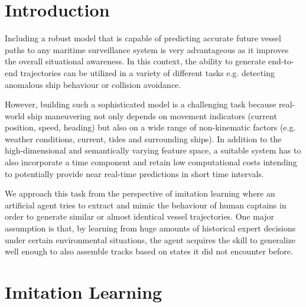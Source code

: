 \documentclass[conference]{IEEEtran}
\begin{document}
\section{Introduction}
Including a robust model that is capable of predicting accurate future vessel paths to any maritime surveillance system is very advantageous as it improves the overall situational awareness. In this context, the ability to generate end-to-end trajectories can be utilized in a variety of different tasks e.g. detecting anomalous ship behaviour or collision avoidance.
\par
However, building such a sophisticated model is a challenging task because real-world ship maneuvering not only depends on movement indicators (current position, speed, heading) but also on a wide range of non-kinematic factors (e.g. weather conditions, current, tides and surrounding ships). In addition to the high-dimensional and semantically varying feature space, a suitable system has to also incorporate a time component and retain low computational costs intending to potentially provide near real-time predictions in short time intervals.
\par
We approach this task from the perspective of imitation learning where an artificial agent tries to extract and mimic the behaviour of human captains in order to generate similar or almost identical vessel trajectories. One major assumption is that, by learning from huge amounts of historical expert decisions under certain environmental situations, the agent acquires the skill to generalize well enough to also assemble tracks based on states it did not encounter before.

\section{Imitation Learning}
\end{document}
